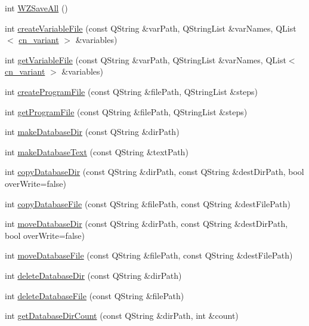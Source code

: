 \begin{DoxyCompactItemize}
\item 
int \hyperlink{classCNRobo_a718a13f465500e00871d664a9dc254ae}{W\-Z\-Save\-All} ()
\item 
int \hyperlink{classCNRobo_a4ce4f56a92c14dcd3e15e6dc7e40caa6}{create\-Variable\-File} (const Q\-String \&var\-Path, Q\-String\-List \&var\-Names, Q\-List$<$ \hyperlink{structcn__variant}{cn\-\_\-variant} $>$ \&variables)
\item 
int \hyperlink{classCNRobo_aa1486df45bc0fe5240f020cbc3d31696}{get\-Variable\-File} (const Q\-String \&var\-Path, Q\-String\-List \&var\-Names, Q\-List$<$ \hyperlink{structcn__variant}{cn\-\_\-variant} $>$ \&variables)
\item 
int \hyperlink{classCNRobo_a5fec260b478591b90401ef40fe74f80a}{create\-Program\-File} (const Q\-String \&file\-Path, Q\-String\-List \&steps)
\item 
int \hyperlink{classCNRobo_a3c8b76606be6ff4709a14ea1ca407341}{get\-Program\-File} (const Q\-String \&file\-Path, Q\-String\-List \&steps)
\item 
int \hyperlink{classCNRobo_ad9b87181d941d071060a9ffbad4e2d79}{make\-Database\-Dir} (const Q\-String \&dir\-Path)
\item 
int \hyperlink{classCNRobo_a3eee1dafbc2da493400f13f9d4d33d1c}{make\-Database\-Text} (const Q\-String \&text\-Path)
\item 
int \hyperlink{classCNRobo_a3694b2094c89e442325e4fff69773ab9}{copy\-Database\-Dir} (const Q\-String \&dir\-Path, const Q\-String \&dest\-Dir\-Path, bool over\-Write=false)
\item 
int \hyperlink{classCNRobo_a1dfa4f921f65483a782ea19e32ce5be6}{copy\-Database\-File} (const Q\-String \&file\-Path, const Q\-String \&dest\-File\-Path)
\item 
int \hyperlink{classCNRobo_aa48db2034789dc27629759d3433921e5}{move\-Database\-Dir} (const Q\-String \&dir\-Path, const Q\-String \&dest\-Dir\-Path, bool over\-Write=false)
\item 
int \hyperlink{classCNRobo_a717baf4ae71fdd895af442f4368e469b}{move\-Database\-File} (const Q\-String \&file\-Path, const Q\-String \&dest\-File\-Path)
\item 
int \hyperlink{classCNRobo_a6a8025a95ee439600c2344d533f669ef}{delete\-Database\-Dir} (const Q\-String \&dir\-Path)
\item 
int \hyperlink{classCNRobo_abac9968c9c23080beaef40e8b3934c75}{delete\-Database\-File} (const Q\-String \&file\-Path)
\item 
int \hyperlink{classCNRobo_a1ffbe315d6fd13a985552fcb452375d6}{get\-Database\-Dir\-Count} (const Q\-String \&dir\-Path, int \&count)

\end{DoxyCompactItemize}
